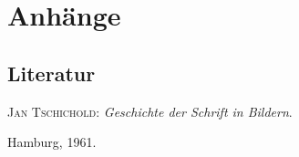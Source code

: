 \part{Anhänge}
\printglossary[style=altlist,title=Glossar]

\chapter{Literatur}
\label{sec:Literatur}
\textsc{Jan Tschichold}:\textit{ Geschichte der Schrift in
  Bildern}.\par \hspace{9.0 pt} Hamburg, 1961.


